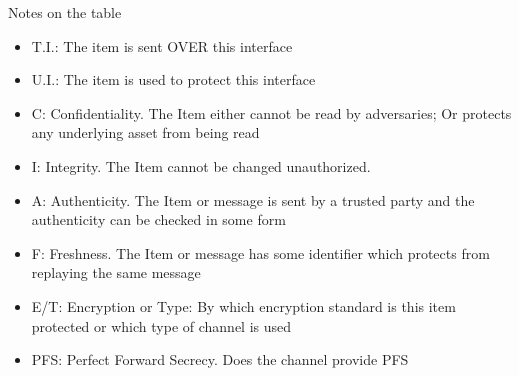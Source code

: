 Notes on the table
\begin{itemize}
    \item T.I.: The item is sent OVER this interface
    \item U.I.: The item is used to protect this interface
    \item C: Confidentiality. The Item either cannot be read by adversaries; Or protects any underlying asset from being read
    \item I: Integrity. The Item cannot be changed unauthorized.
    \item A: Authenticity. The Item or message is sent by a trusted party and the authenticity can be checked in some form
    \item F: Freshness. The Item or message has some identifier which protects from replaying the same message
    \item E/T: Encryption or Type: By which encryption standard is this item protected or which type of channel is used
    \item PFS: Perfect Forward Secrecy. Does the channel provide PFS
\end{itemize}


